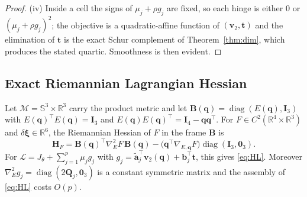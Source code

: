 \begin{proof}
(iv) Inside a cell the signs of $\mu_j+\rho g_j$ are fixed, so each hinge is either $0$ or $(\mu_j+\rho g_j)^2$; the objective is a quadratic-affine function of $(\mathbf v_2,\mathbf t)$ and the elimination of $\mathbf t$ is the exact Schur complement of Theorem~\ref{thm:dim}, which produces the stated quartic. Smoothness is then evident.
\end{proof}

\subsection{Exact Riemannian Lagrangian Hessian}\label{app:hessian}
\begin{lemma}\label{lem:hessian}
Let $\mathcal M=\mathbb S^3\times\mathbb R^3$ carry the product metric and let $\mathbf B(\mathbf q)=\operatorname{diag}(E(\mathbf q),\mathbf I_3)$ with $E(\mathbf q)^\top E(\mathbf q)=\mathbf I_3$ and $E(\mathbf q)E(\mathbf q)^\top=\mathbf I_4-\mathbf q\mathbf q^\top$. For $F\in C^2(\mathbb R^4\times\mathbb R^3)$ and $\delta\boldsymbol\xi\in\mathbb R^6$, the Riemannian Hessian of $F$ in the frame $\mathbf B$ is
\begin{equation}
\mathbf H_F=\mathbf B(\mathbf q)^\top\nabla_E^2F\,\mathbf B(\mathbf q)-\big(\mathbf q^\top\nabla_{E,\mathbf q}F\big)\operatorname{diag}(\mathbf I_3,\mathbf 0_3).
\label{eq:hF}
\end{equation}
For $\mathcal L=J_\theta+\sum_{j=1}^p\mu_jg_j$ with $g_j=\tilde{\mathbf a}_j^\top\mathbf v_2(\mathbf q)+\mathbf b_j^\top\mathbf t$, this gives \eqref{eq:HL}. Moreover $\nabla_E^2g_j=\operatorname{diag}(2\mathbf Q_j,\mathbf 0_3)$ is a constant symmetric matrix and the assembly of \eqref{eq:HL} costs $O(p)$.
\end{lemma}
